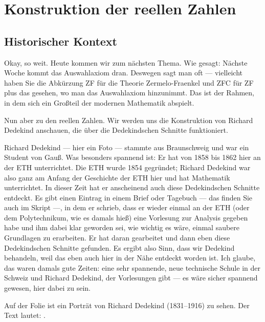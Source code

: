 \section{Konstruktion der reellen Zahlen}

\subsection{Historischer Kontext}

\begin{spoken-clean}[00:09:01 - 00:11:09]
Okay, so weit. Heute kommen wir zum nächsten Thema. Wie gesagt: Nächste Woche kommt das Auswahlaxiom dran. Deswegen sagt man oft  --- vielleicht haben Sie die Abkürzung ZF für die Theorie Zermelo-Fraenkel und ZFC für ZF plus das  gesehen, wo man das Auswahlaxiom hinzunimmt. Das ist der Rahmen, in dem sich ein Großteil der modernen Mathematik abspielt.

Nun aber zu den reellen Zahlen. Wir werden uns die Konstruktion von Richard Dedekind anschauen, die über die Dedekindschen Schnitte funktioniert.

Richard Dedekind --- hier ein Foto --- stammte aus Braunschweig und war ein Student von Gauß. Was besonders spannend ist: Er hat von 1858 bis 1862 hier an der ETH unterrichtet. Die ETH wurde 1854 gegründet; Richard Dedekind war also ganz am Anfang der Geschichte der ETH hier und hat Mathematik unterrichtet. In dieser Zeit hat er anscheinend auch diese Dedekindschen Schnitte entdeckt. Es gibt einen Eintrag in einem Brief oder Tagebuch --- das finden Sie auch im Skript ---, in dem er schrieb, dass er wieder einmal an der ETH (oder dem Polytechnikum, wie es damals hieß) eine Vorlesung zur Analysis gegeben habe und ihm dabei klar geworden sei, wie wichtig es wäre, einmal saubere Grundlagen zu erarbeiten. Er hat daran gearbeitet und dann eben diese Dedekindschen Schnitte gefunden. Es ergibt also Sinn, dass wir Dedekind behandeln, weil das eben auch hier in der Nähe entdeckt worden ist. Ich glaube, das waren damals gute Zeiten: eine sehr spannende, neue technische Schule in der Schweiz und Richard Dedekind, der Vorlesungen gibt --- es wäre sicher spannend gewesen, hier dabei zu sein.
\end{spoken-clean}

\begin{meta-note}
Auf der Folie ist ein Porträt von Richard Dedekind (1831--1916) zu sehen. Der Text lautet: .
\end{meta-note}

